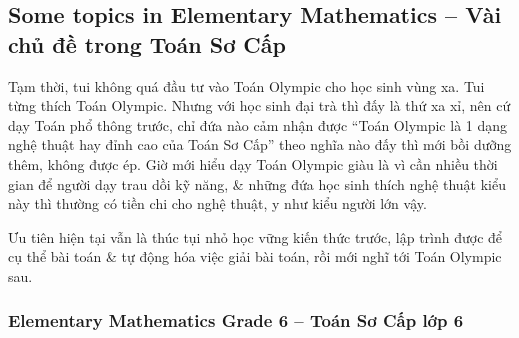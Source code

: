 \documentclass[12pt,oneside]{book}
\begin{document}
\subsection{Some topics in Elementary Mathematics -- Vài chủ đề trong Toán Sơ Cấp}
Tạm thời, tui không quá đầu tư vào Toán Olympic cho học sinh vùng xa. Tui từng thích Toán Olympic. Nhưng với học sinh đại trà thì đấy là thứ xa xỉ, nên cứ dạy Toán phổ thông trước, chỉ đứa nào cảm nhận được ``Toán Olympic là 1 dạng nghệ thuật hay đỉnh cao của Toán Sơ Cấp'' theo nghĩa nào đấy thì mới bồi dưỡng thêm, không được ép. Giờ mới hiểu dạy Toán Olympic giàu là vì cần nhiều thời gian để người dạy trau dồi kỹ năng, \& những đứa học sinh thích nghệ thuật kiểu này thì thường có tiền chi cho nghệ thuật, y như kiểu người lớn vậy.

Ưu tiên hiện tại vẫn là thúc tụi nhỏ học vững kiến thức trước, lập trình được để cụ thể bài toán \& tự động hóa việc giải bài toán, rồi mới nghĩ tới Toán Olympic sau.

\subsubsection{Elementary Mathematics Grade 6 -- Toán Sơ Cấp lớp 6}
\end{document}
